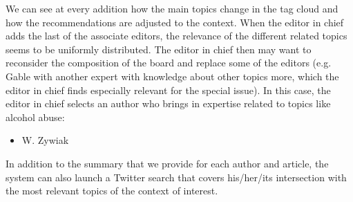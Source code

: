 We can see at every addition how the main topics change in the tag cloud and how the recommendations are adjusted to the context. When the editor in chief adds the last of the associate editors, the relevance of the different related topics seems to be uniformly distributed. The editor in chief then may want to reconsider the composition of the board and replace some of the editors (e.g. Gable with another expert with knowledge about other topics more, which the editor in chief finds especially relevant for the special issue).  In this case, the editor in chief selects an author who brings in expertise related to topics like alcohol abuse:
\begin{itemize}
  \item W. Zywiak
\end{itemize}
In addition to the summary that we provide for each author and article, the system can also launch a Twitter search that covers his/her/its intersection with the most relevant topics of the context of interest.
